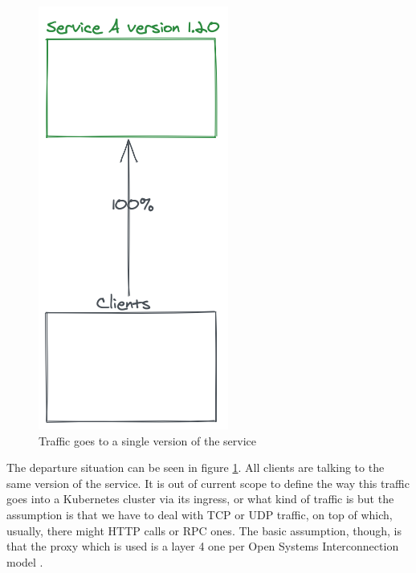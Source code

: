 \documentclass[conference]{IEEEtran}
\begin{document}
    \begin{figure}
        \centering
        \includegraphics[scale=0.25]{traffic100old.png}
        \caption{Traffic goes to a single version of the service}
        \label{fig:traffic100old}
    \end{figure}

    The departure situation can be seen in figure \ref{fig:traffic100old}. All clients are talking to the same version of the service. It is out of current scope to define the way this traffic goes into a Kubernetes cluster via its ingress, or what kind of traffic is but the assumption is that we have to deal with TCP or UDP traffic, on top of which, usually, there might HTTP calls or RPC ones. The basic assumption, though, is that the proxy which is used is a layer 4 one per Open Systems Interconnection model \cite{b14}.
\end{document}
